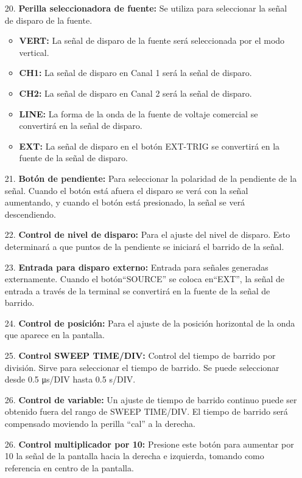 \documentclass{report}
\begin{document}
\begin{itemize}
\item[20.] \textbf{Perilla seleccionadora de fuente:} Se utiliza para seleccionar la señal de disparo de la fuente.
\begin{itemize}
\item \textbf{VERT:} La señal de disparo de la fuente será seleccionada por el modo vertical.
\item \textbf{CH1:} La señal de disparo en Canal 1 será la señal de disparo.
\item \textbf{CH2:} La señal de disparo en Canal 2 será la señal de disparo.
\item \textbf{LINE:} La forma de la onda de la fuente de voltaje comercial se
convertirá en la señal de disparo.
\item \textbf{EXT:} La señal de disparo en el botón EXT-TRIG se convertirá en la
fuente de la señal de disparo.
\end{itemize}
\item[21.] \textbf{Botón de pendiente:} Para seleccionar la polaridad de la pendiente de la señal. Cuando el botón está afuera el disparo se verá con la señal aumentando, y cuando el botón está presionado, la señal se verá descendiendo.
\item[22.] \textbf{Control de nivel de disparo:} Para el ajuste del nivel de disparo. Esto determinará a que puntos de la pendiente se iniciará el barrido de la señal.
\item[23.] \textbf{Entrada para disparo externo:} Entrada para señales generadas externamente. Cuando el botón``SOURCE'' se coloca en``EXT'', la señal de entrada a través de la terminal se convertirá en la fuente de la señal de barrido.
\item[24.] \textbf{Control de posición:} Para el ajuste de la posición horizontal de la onda que aparece en la pantalla.
\item[25.] \textbf{Control SWEEP TIME/DIV:} Control del tiempo de barrido por división. Sirve para seleccionar el tiempo de barrido. Se puede seleccionar desde 0.5 \si{\micro\second}/DIV hasta 0.5 \si{\second}/DIV.
\item[26.] \textbf{Control de variable:} Un ajuste de tiempo de barrido continuo puede ser obtenido fuera del rango de SWEEP TIME/DIV. El tiempo de barrido será compensado moviendo la perilla ``cal'' a la derecha.
\item[26.] \textbf{Control multiplicador por 10:} Presione este botón para aumentar por 10 la señal de la pantalla hacia la derecha e izquierda, tomando como referencia en centro de la pantalla.
\end{itemize}
\end{document}
